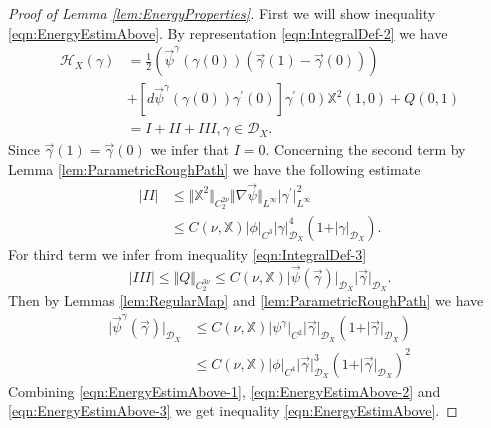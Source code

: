 \documentclass[11pt,a4paper,leqno]{amsart}%
\theoremstyle{plain}
\theoremstyle{remark}
\theoremstyle{plain}
\numberwithin{equation}{section}
\begin{document}
\begin{proof}[ Proof of Lemma \ref{lem:EnergyProperties}]
First we will show inequality \eqref{eqn:EnergyEstimAbove}. By
representation \eqref{eqn:IntegralDef-2} we have
\begin{align}
\mathcal{H}_X(\gamma)&=\frac{1}{2}(\vec{\psi}^{\gamma}(\gamma(0))(\vec{\gamma}(1)-\vec{\gamma}(0)))\nonumber\\
&+\left[d\vec{\psi}^{\gamma}(\gamma(0))\gamma^\prime(0)\right]\gamma^\prime(0)\mathbb{X}^2(1,0)+Q(0,1)\nonumber\\
&=I+II+III,\gamma\in\mathcal{D}_X.\nonumber
\end{align}
Since $\vec{\gamma}(1)=\vec{\gamma}(0)$ we infer that $I=0$.
Concerning the second term by Lemma \ref{lem:ParametricRoughPath}
we have the following estimate
\begin{align}
\vert II\vert &\leq
\Vert \mathbb{X}^2\Vert_{C_2^{2\nu}}\Vert \nabla\vec{\psi}\Vert_{L^{\infty}}\vert \gamma^\prime\vert_{L^{\infty}}^2\nonumber\\
&\leq
C(\nu,\mathbb{X})\vert \phi\vert_{C^3}\vert \gamma\vert_{\mathcal{D}_X}^4(1+\vert \gamma\vert_{\mathcal{D}_X}).\label{eqn:EnergyEstimAbove-1}
\end{align}
For third term we infer from inequality \eqref{eqn:IntegralDef-3}
\begin{equation}
\vert III\vert \leq \Vert Q\Vert_{C_2^{3\nu}}\leq
C(\nu,\mathbb{X})\vert \vec{\psi}(\vec{\gamma})\vert_{\mathcal{D}_X}\vert \vec{\gamma}\vert_{\mathcal{D}_X}.\label{eqn:EnergyEstimAbove-2}
\end{equation}
Then by Lemmas \ref{lem:RegularMap} and
\ref{lem:ParametricRoughPath} we have
\begin{align}
\vert \vec{\psi}^{\gamma}(\vec{\gamma})\vert_{\mathcal{D}_X}&\leq
C(\nu,\mathbb{X})\vert \psi^{\gamma}\vert_{C^2}\vert \vec{\gamma}\vert_{\mathcal{D}_X}(1+\vert \vec{\gamma}\vert_{\mathcal{D}_X})\nonumber\\
&\leq C(\nu,\mathbb{X})\vert \phi\vert_{C^4}\vert \vec{\gamma}\vert_{\mathcal{D}_X}^3(1+\vert \vec{\gamma}\vert_{\mathcal{D}_X})^2\label{eqn:EnergyEstimAbove-3}
\end{align}
Combining \eqref{eqn:EnergyEstimAbove-1},
\eqref{eqn:EnergyEstimAbove-2} and \eqref{eqn:EnergyEstimAbove-3}
we get inequality \eqref{eqn:EnergyEstimAbove}.


\end{proof}
\end{document}
